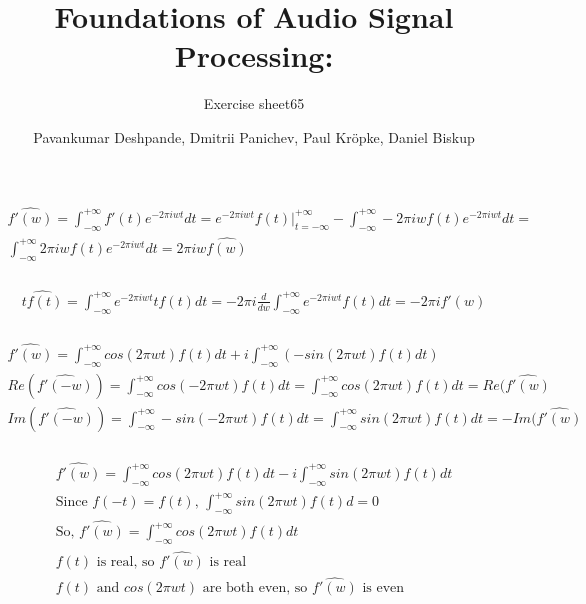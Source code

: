 \documentclass[11pt,a4paper]{scrartcl}
\begin{document}
\author{Pavankumar Deshpande, Dmitrii Panichev, Paul Kröpke, Daniel Biskup}
\title{Foundations of Audio Signal Processing:}
\subtitle{Exercise sheet65}
\maketitle

\setcounter{section}{6} %
\subsection{} %
\subsubsection{} %
\begin{align}
\widehat{f'(w)}=\int_{-\infty}^{+\infty}f'(t)e^{-2 \pi iwt}dt = e^{-2 \pi iwt}f(t)\rvert_{t=-\infty}^{+\infty} - \int_{-\infty}^{+\infty}-2 \pi iwf(t)e^{-2 \pi iwt}dt =\\
\int_{-\infty}^{+\infty}2 \pi iwf(t)e^{-2 \pi iwt}dt = 2 \pi iw \hat{f(w)}
\end{align}

\subsubsection{} %
\begin{align}
\widehat{tf(t)} = \int_{-\infty}^{+\infty}e^{-2 \pi iwt}tf(t)dt = -2 \pi i \frac{d}{dw} \int_{-\infty}^{+\infty}e^{-2 \pi iwt}f(t)dt = -2 \pi i f'(w)
\end{align}

\subsubsection{} %
\begin{align}
\widehat{f'(w)}=\int_{-\infty}^{+\infty}cos(2 \pi wt)f(t)dt + i\int_{-\infty}^{+\infty}(-sin(2 \pi wt)f(t)dt)\\
Re(\widehat{f'(-w)}) = \int_{-\infty}^{+\infty}cos(-2 \pi wt)f(t)dt = \int_{-\infty}^{+\infty}cos(2 \pi wt)f(t)dt = Re(\widehat{f'(w)}\\
Im(\widehat{f'(-w)}) = \int_{-\infty}^{+\infty}-sin(-2 \pi wt)f(t)dt = \int_{-\infty}^{+\infty}sin(2 \pi wt)f(t)dt = -Im(\widehat{f'(w)}
\end{align}

\subsubsection{} %
\begin{align}
\widehat{f'(w)}=\int_{-\infty}^{+\infty}cos(2 \pi wt)f(t)dt - i\int_{-\infty}^{+\infty}sin(2 \pi wt)f(t)dt\\
\text{Since $f(-t) = f(t)$, $\int_{-\infty}^{+\infty}sin(2 \pi wt)f(t)d = 0$}\\
\text{So, $\widehat{f'(w)}=\int_{-\infty}^{+\infty}cos(2 \pi wt)f(t)dt$}\\
\text{$f(t)$ is real, so  $\widehat{f'(w)}$ is real}\\
\text{$f(t)$ and $cos(2 \pi wt)$ are both even, so  $\widehat{f'(w)}$ is even}
\end{align}
\end{document}
